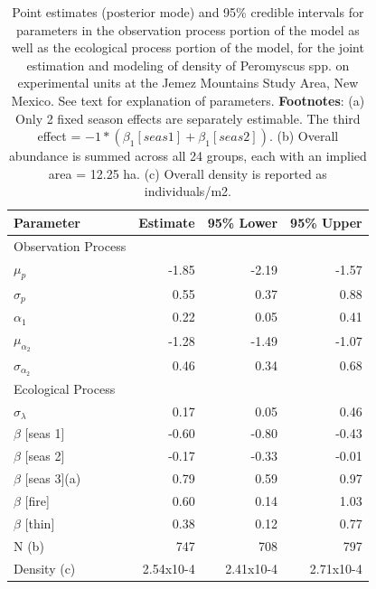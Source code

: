 \begin{table}
\centering
\caption{
  Point estimates (posterior mode) and 95\% credible intervals
  for parameters in the observation
  process portion of the model as well
  as the ecological process portion of
  the model, for the joint estimation
  and modeling of density of
  Peromyscus spp. on experimental
  units at the Jemez Mountains Study
  Area, New Mexico.  See text for explanation of parameters. 
  {\bf Footnotes}: 
  (a) Only 2 fixed season effects are separately estimable.  The third
  effect =
  $ -1*(\beta_1 [seas 1]+\beta_1 [seas 2])$.
  (b) Overall abundance is summed across all 24 groups, each with an
  implied 
  area = 12.25 ha.  
  (c) Overall density is reported as individuals/m2.  
}
\begin{tabular}{lrrr}
\hline \hline
Parameter &	Estimate &	95\% Lower &	95\% Upper 
\\ \hline
Observation Process & & & \\ \hline
$\mu_{p}$        &-1.85 & -2.19 &	-1.57 \\
$\sigma_{p}$           &0.55  & 0.37  &	0.88 \\
$\alpha_1$        &0.22  & 0.05  &	0.41 \\
$\mu_{\alpha_{2}}$             &-1.28 & -1.49 &	-1.07 \\
$\sigma_{\alpha_{2}}$     &0.46  & 0.34  &		0.68 \\ \hline \hline
Ecological Process & & & \\
\hline
$\sigma_{\lambda}$      & 0.17 & 0.05  &	0.46 \\
$\beta$ [seas 1] &-0.60 & -0.80 &	-0.43 \\
$\beta$ [seas 2] &-0.17 & -0.33 &	-0.01\\
$\beta$ [seas 3](a) &0.79 & 0.59  &	0.97\\
$\beta$ [fire] &	0.60     & 0.14  &	1.03 \\
$\beta$ [thin] &	0.38     & 0.12  &	0.77 \\
N (b)&	747&	708      & 797 \\
Density (c)&2.54x10-4&2.41x10-4&	2.71x10-4 \\ \hline
\end{tabular}
\end{table}







